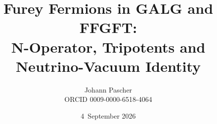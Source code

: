 \documentclass[11pt,a4paper]{report}
\title{Furey Fermions in GALG and FFGFT:\\[0.5em]
  \large N-Operator, Tripotents and Neutrino-Vacuum Identity}
\date{4~September 2026}
\author{Johann Pascher\\\small ORCID 0009-0000-6518-4064}
\begin{document}
\renewcommand{\thechapter}{}
\renewcommand{\thesection}{\arabic{section}}
\maketitle
\tableofcontents

\end{document}
